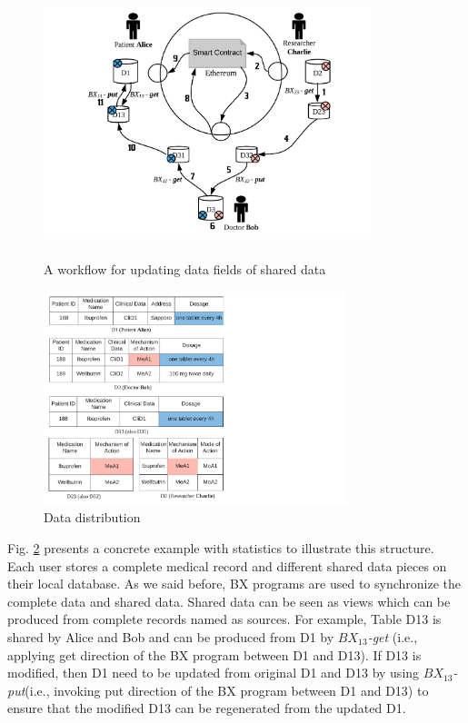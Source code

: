 \documentclass[conference]{IEEEtran}
\begin{document}
\begin{figure}[htbp]
	\centerline{\includegraphics[width=270pt,height=220pt]{updateScenario.pdf}}
	\caption{A workflow for updating data fields of shared data}
	\label{workflow}
\end{figure}

\begin{figure}[htbp]
	\centerline{\includegraphics[width=250pt]{medicalData.pdf}}
	\caption{Data distribution}
	\label{dataRepresentation}
\end{figure}

Fig. \ref{dataRepresentation} presents a concrete example with statistics to illustrate this structure. Each user stores a complete medical record and different shared data pieces on their local database.
As we said before, BX programs are used to synchronize the complete data and shared data. Shared data can be seen as views which can be produced from complete records named as sources. For example, Table D13 is shared by Alice and Bob and can be produced from D1 by \emph{$BX_{13}$-get} (i.e., applying get direction of the BX program between D1 and D13). If D13 is modified, then D1 need to be updated from original D1 and D13 by using  \emph{$BX_{13}$-put}(i.e., invoking put direction of the BX program between D1 and D13) to ensure that the modified D13 can be regenerated from the updated D1.  
\end{document}
